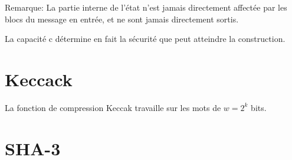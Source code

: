 \documentclass[10.5pt, a4paper, twoside, openright]{report}
\begin{document}
Remarque: La partie interne de l'état n'est jamais directement affectée par les blocs du message en entrée, et ne sont jamais directement sortis.

La capacité c détermine en fait la sécurité que peut atteindre la construction. 


\section{Keccack}
La fonction de compression Keccak travaille sur les mots de $w=2^k$ bits.
\section{SHA-3}
\end{document}
